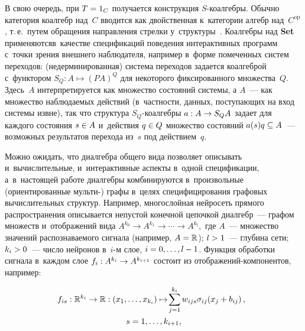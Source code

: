 \begin{multicols}{2}
  В свою очередь, при $T\hm= 1_C$ получается конструкция  
$S$-ко\-ал\-геб\-ры. Обычно категория коалгебр над~$C$ вводится как 
двойственная к~категории ал\-гебр над~$C^{\mathrm{op}}$, т.\,е.\ путем обращения 
на\-прав\-ле\-ния стрел\-ки у~структуры~\cite{7-kov}. Коалгебры над \textbf{Set} 
применяются\linebreak в~качестве спецификаций поведения интерактивных программ 
с~точки зрения внеш\-не\-го наблюдателя, например в~форме помеченных сис\-тем 
переходов: (недерминированная) сис\-те\-ма переходов \mbox{задается} коалгеброй 
с~функтором $S_Q : A \mapsto (PA)^Q$ для некоторого фиксированного 
множества~$Q$. Здесь~$A$ интерпретируется как множество со\-сто\-яний 
сис\-те\-мы, а $A$~--- как множество наблюдаемых действий (в~част\-ности, 
данных, по\-сту\-па\-ющих на вход сис\-те\-мы извне), так что структура  
$S_Q$-ко\-ал\-геб\-ры $a : A\hm\to S_QA$ задает для каж\-до\-го со\-сто\-яния 
$s\hm\in A$ и~действия $q\hm\in Q$ множество со\-сто\-яний $a(s)q \hm \subseteq 
A$~--- воз\-мож\-ных результатов перехода из~$s$ под действием~$q$.
  
  Можно ожидать, что ди\-ал\-геб\-ра общего вида позволяет описывать 
  и~вычислительные, и~интерактивные аспекты в~одной спецификации, 
а~в~на\-сто\-ящей работе ди\-ал\-геб\-ры комбинируются в~\mbox{произвольные} 
(ориентированные муль\-ти-) графы в~целях специфицирования графовых 
вы\-чис\-ли\-тель\-ных структур. Например, многослойная нейросеть прямого 
рас\-про\-стра\-не\-ния описывается не\-пус\-той конечной цепочкой ди\-ал\-гебр~--- 
графом множеств и~отоб\-ра\-же\-ний вида
  $A^{k_0}\to A^{k_1}\to \cdots \to A^{k_l},$
где $A$~--- множество значений распознаваемого сигнала (например, $A\hm= 
\mathbb{R}$); $l\hm>1$~--- глубина сети; $k_i\hm>0$~--- чис\-ло нейронов в~$i$-м 
слое, $i\hm = 0, \ldots, l \hm- 1$. Функция обработки сигнала в~каж\-дом слое $f_i 
: A^{k_i}\hm\to  A^{k_{i+1}}$ со\-сто\-ит из отоб\-ра\-же\-ний-ком\-по\-нен\-тов, например:

\vspace*{-6pt}

\noindent
\begin{multline*}
     \hspace*{-5.69pt}f_{is} : \mathbb{R}^{k_i}\to  \mathbb{R} : \left(x_1, \ldots, x_{k_i}\right) 
\mapsto \!\sum\limits_{j=1}^{k_i} w_{ijs}\sigma_{ij}\!\left(x_j + b_{ij}\right),\\
      s = 1, \ldots, k_{i+1},
\end{multline*}

\vspace*{-6pt}


\end{multicols}
